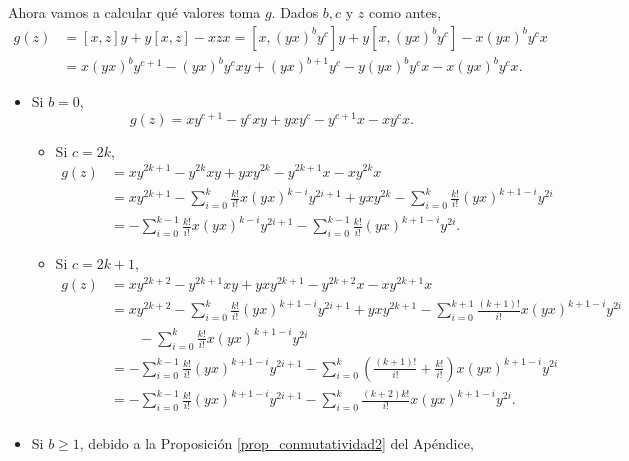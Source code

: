 \documentclass[fleqn,../tesis.tex]{subfiles}
\begin{document}
Ahora vamos a calcular qué valores toma $g$. Dados $b, c$ y $z$ como antes,
\begin{align*}
    g(z) &= \left[x,z\right]y + y\left[x,z\right] - xzx = \left[x, (yx)^by^c\right]y + y\left[x, (yx)^by^c\right] - x(yx)^by^c x\\
    &= x(yx)^by^{c + 1} - (yx)^by^{c}xy + (yx)^{b + 1}y^c - y(yx)^by^cx - x(yx)^by^cx.
\end{align*}
\begin{itemize}
    \item Si $b = 0$,
        \[
            g(z) = xy^{c + 1} - y^{c}xy + yxy^{c} - y^{c + 1}x - xy^{c}x.
        \]
        \begin{itemize}
            \item Si $c = 2k$,
            \begin{align*}
                g(z) &= xy^{2k + 1} - y^{2k}xy + yxy^{2k} - y^{2k + 1}x - xy^{2k}x\\
                &= xy^{2k + 1} - \sum_{i = 0}^{k}\frac{k!}{i!}x(yx)^{k - i}y^{2i + 1} + yxy^{2k}
                    - \sum_{i = 0}^{k}\frac{k!}{i!}(yx)^{k + 1 - i}y^{2i}\\
                &= - \sum_{i = 0}^{k - 1}\frac{k!}{i!}x(yx)^{k - i}y^{2i + 1} -  \sum_{i = 0}^{k - 1}\frac{k!}{i!}(yx)^{k + 1 - i}y^{2i}.
            \end{align*}
            \item Si $c = 2k + 1$,
            \begin{align*}
                g(z) &= xy^{2k + 2} - y^{2k + 1}xy + yxy^{2k + 1} - y^{2k + 2}x - xy^{2k + 1}x\\
                &= xy^{2k + 2} - \sum_{i = 0}^{k}\frac{k!}{i!}(yx)^{k + 1 - i}y^{2i + 1} + yxy^{2k + 1}
                    - \sum_{i = 0}^{k + 1}\frac{(k+ 1)!}{i!}x(yx)^{k + 1 -i}y^{2i} \\
                    &\qquad - \sum_{i = 0}^{k}\frac{k!}{i!}x(yx)^{k + 1 -i}y^{2i}\\
                &= - \sum_{i = 0}^{k - 1}\frac{k!}{i!}(yx)^{k + 1 - i}y^{2i + 1}
                    - \sum_{i = 0}^{k}\left(\frac{(k+ 1)!}{i!} + \frac{k!}{i!}\right)x(yx)^{k + 1 -i}y^{2i}\\
                &= - \sum_{i = 0}^{k - 1}\frac{k!}{i!}(yx)^{k + 1 - i}y^{2i + 1}
                    - \sum_{i = 0}^{k}\frac{(k + 2)k!}{i!}x(yx)^{k + 1 -i}y^{2i}.\\
            \end{align*}
        \end{itemize}
    \item Si $b \geq 1$, debido a la Proposición \ref{prop_conmutatividad2} del Apéndice,

\end{itemize}
\end{document}
